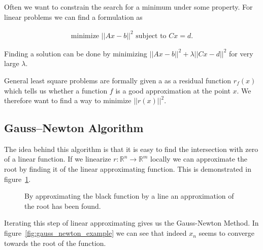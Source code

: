 Often we want to constrain the search for a minimum under some property. For linear problems we can find a formulation as

\begin{align*}
	\text{minimize } ||Ax-b||^2 \text{ subject to } Cx=d.
\end{align*}

Finding a solution can be done by minimizing $||Ax-b||^2 + \lambda ||Cx-d||^2$ for very large $\lambda$.

General least square problems are formally given a as a residual function $r_f(x)$ which tells us whether a function $f$ is a good approximation at the point $x$. We therefore want to find a way to minimize $||r(x)||^2$.

\subsection{Gauss–Newton Algorithm}

The idea behind this algorithm is that it is easy to find the intersection with zero of a linear function. If we linearize $r:\mathbb{R}^n \rightarrow \mathbb{R}^m$ locally we can approximate the root by finding it of the linear approximating function. This is demonstrated in figure~\ref{fig:approx_root_with_lin}.

\begin{figure}[h]
	\centering
	\caption{By approximating the black function by a line an approximation of the root has been found.}
	\label{fig:approx_root_with_lin}
\end{figure}

Iterating this step of linear approximating gives us the Gauss-Newton Method. In figure~\ref{fig:gauss_newton_example} we can see that indeed $x_n$ seems to converge towards the root of the function.


